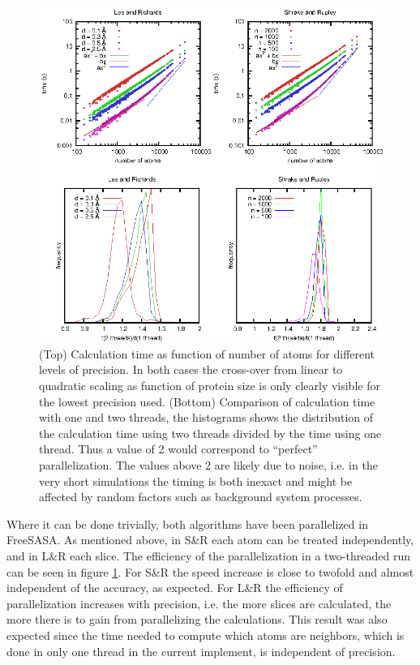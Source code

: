 \documentclass[a4paper,11pt]{article}
\begin{document}
\begin{figure}
  \begin{center}
  \includegraphics{fig/time}
  \caption{(Top) Calculation time as function of number of atoms for
    different levels of precision. In both cases the cross-over from
    linear to quadratic scaling as function of protein size is only
    clearly visible for the lowest precision used.  (Bottom)
    Comparison of calculation time with one and two threads, the
    histograms shows the distribution of the calculation time using
    two threads divided by the time using one thread. Thus a value of
    2 would correspond to ``perfect'' parallelization. The values
    above 2 are likely due to noise, i.e. in the very short
    simulations the timing is both inexact and might be affected by
    random factors such as background system processes.
    \label{fig:time}}
  \end{center}
\end{figure}

Where it can be done trivially, both algorithms have been
parallelized in FreeSASA. As mentioned above, in S\&R each atom can be treated
independently, and in L\&R each slice. The efficiency of the
parallelization in a two-threaded run can be seen in figure
\ref{fig:time}. For S\&R the speed increase is close to twofold and
almost independent of the accuracy, as expected. For L\&R the
efficiency of parallelization increases with precision, i.e. the more
slices are calculated, the more there is to gain from parallelizing
the calculations. This result was also expected since the time needed
to compute which atoms are neighbors, which is done in only one thread
in the current implement, is independent of precision.
\end{document}
